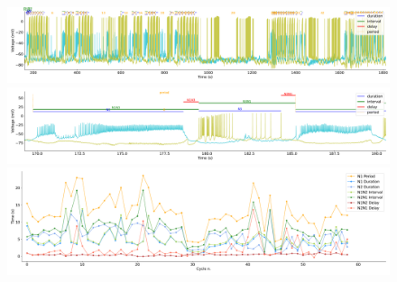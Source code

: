 \begin{figure}[htbp]
	\centering
	\begin{minipage}[b]{\textwidth}
		\centering
		\includegraphics[width=\textwidth,height=0.1\textheight]{./invariants/data/SUSSEX/prep3/images/prep3_3phases_signal_intervals_zoom.pdf}
		\includegraphics[width=\textwidth]{./invariants/data/SUSSEX/prep3/images/prep3_signal_intervals_cycle.pdf}
		\includegraphics[width=\textwidth]{./invariants/data/SUSSEX/prep3/images/prep3_time_cycle.pdf}
	\end{minipage}
	\begin{minipage}{0.9\textwidth}
		\centering
		\begin{minipage}[b]{0.45\textwidth}
			\centering

\end{minipage}
\end{minipage}
\end{figure}
